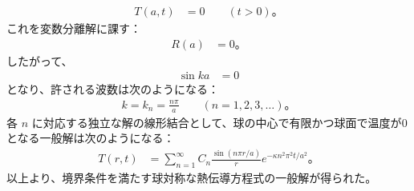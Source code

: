 \documentclass[platex,dvipdfmx,a4paper]{jsarticle}
\begin{document}
  \begin{align*}
    T(a,t)&=0\qquad (t>0)。
  \end{align*}
  これを変数分離解に課す：
  \begin{align*}
    R(a)&=0。
  \end{align*}
  したがって、
  \begin{align*}
    \sin ka&=0
  \end{align*}
  となり、許される波数は次のようになる：
  \begin{align*}
    k=k_n=\frac{n\pi}{a}\qquad (n=1,2,3,\ldots)。
  \end{align*}
  各 $n$ に対応する独立な解の線形結合として、球の中心で有限かつ球面で温度が$0$となる一般解は次のようになる：
  \begin{align*}
    T(r,t)&=\sum_{n=1}^{\infty}C_n\frac{\sin(n\pi r/a)}{r}e^{-\kappa n^2\pi^2t/a^2}。
  \end{align*}
  以上より、境界条件を満たす球対称な熱伝導方程式の一般解が得られた。
\end{document}
